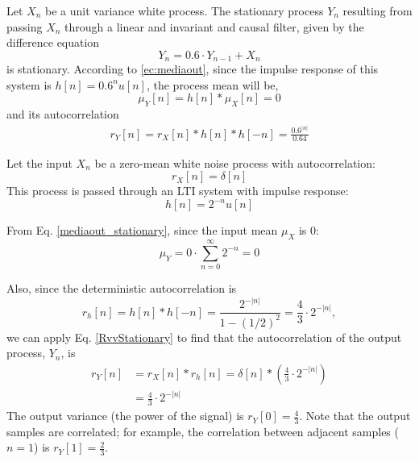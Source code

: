 \begin{example}
  \label{eg:v_estac_ergod}
Let $X_n$ be a unit variance white process. The stationary process $Y_n$ resulting from passing $X_n$ through a linear and invariant and causal filter, given by the difference equation
  \begin{equation}
    Y_n = 0.6 \cdot Y_{n-1} + X_n
  \end{equation}
is stationary. According to \eqref{ec:mediaout}, since the impulse response of this system is $h[n]=0.6^n u[n]$, the process mean will be, 
\begin{equation}
\mu_Y[n] = h[n]*\mu_X[n] = 0
\label{ec:meanv_mediate}
\end{equation}
and its autocorrelation
\begin{eqnarray}
r_Y[n] = r_X[n]*h[n]*h[-n] = \frac{0.6^{|n|}}{0.64}
\label{ec:Rvv_Rrr}
\end{eqnarray}
\end{example}

\begin{example}

Let the input $X_n$ be a zero-mean white noise process with autocorrelation:
\begin{equation*}
r_X[n] = \delta[n]
\end{equation*}
This process is passed through an LTI system with impulse response:
\begin{equation*}
h[n] = 2^{-n} u[n]
\end{equation*}

From Eq. \eqref{mediaout_stationary}, since the input mean $\mu_X$ is $0$:
\begin{equation*}
\mu_Y = 0 \cdot \sum_{n=0}^{\infty} 2^{-n} = 0
\end{equation*}

Also, since the deterministic autocorrelation is
\begin{equation*}
r_h[n] = h[n] * h[-n] 
       = \frac{2^{-|n|}}{1 - (1/2)^2}
       = \frac43 \cdot 2^{-|n|},
\end{equation*}
we can apply Eq. \eqref{RvvStationary} to find that the autocorrelation of the output process, $Y_n$, is
\begin{align*}
r_Y[n] &= r_X[n] * r_h[n]
        = \delta[n] * \left( \frac43 \cdot 2^{-|n|} \right) \\
       &= \frac{4}{3} \cdot 2^{-|n|}
\end{align*}
The output variance (the power of the signal) is $r_Y[0] = \frac{4}{3}$. Note that the output samples are correlated; for example, the correlation between adjacent samples ($n=1$) is $r_Y[1] = \frac{2}{3}$.
\end{example}




